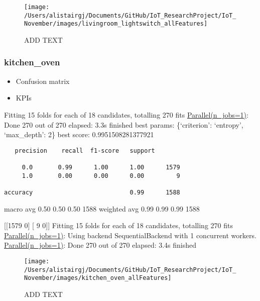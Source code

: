 \documentclass[11pt,]{article}
\providecommand{\tightlist}{%
  \setlength{\itemsep}{0pt}\setlength{\parskip}{0pt}}
\begin{document}
\begin{figure}[H]

{\centering \texttt{[image: /Users/alistairgj/Documents/GitHub/IoT\_ResearchProject/IoT\_November/images/livingroom\_lightswitch\_allFeatures]} 

}

\caption{ADD TEXT}\label{fig:unnamed-chunk-18}
\end{figure}

\pagebreak

\hypertarget{kitchen_oven}{%
\subsubsection{kitchen\_oven}\label{kitchen_oven}}

\begin{itemize}
\tightlist
\item
  Confusion matrix
\item
  KPIs
\end{itemize}

Fitting 15 folds for each of 18 candidates, totalling 270 fits
\href{Done\%20270\%20out\%20of\%20270\%20\%7C\%20elapsed:\%202.1s\%20finished}{Parallel(n\_jobs=1)}:
Done 270 out of 270 \textbar{} elapsed: 3.3s finished best params:
\{`criterion': `entropy', `max\_depth': 2\} best score:
0.9951508281377921

\begin{verbatim}
   precision    recall  f1-score   support

     0.0       0.99      1.00      1.00      1579
     1.0       0.00      0.00      0.00         9

accuracy                           0.99      1588
\end{verbatim}

macro avg 0.50 0.50 0.50 1588 weighted avg 0.99 0.99 0.99 1588

{[}{[}1579 0{]} {[} 9 0{]}{]} Fitting 15 folds for each of 18
candidates, totalling 270 fits
\href{Done\%20270\%20out\%20of\%20270\%20\%7C\%20elapsed:\%202.1s\%20finished}{Parallel(n\_jobs=1)}:
Using backend SequentialBackend with 1 concurrent workers.
\href{Done\%20270\%20out\%20of\%20270\%20\%7C\%20elapsed:\%202.1s\%20finished}{Parallel(n\_jobs=1)}:
Done 270 out of 270 \textbar{} elapsed: 3.4s finished

\begin{figure}[H]

{\centering \texttt{[image: /Users/alistairgj/Documents/GitHub/IoT\_ResearchProject/IoT\_November/images/kitchen\_oven\_allFeatures]} 

}

\caption{ADD TEXT}\label{fig:unnamed-chunk-19}
\end{figure}
\end{document}
